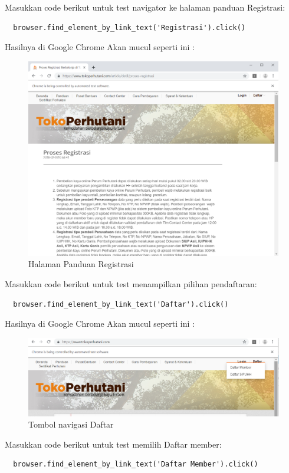 Masukkan code berikut untuk test navigator ke halaman panduan Registrasi:
\begin{verbatim}
  browser.find_element_by_link_text('Registrasi').click()
\end{verbatim}

Hasilnya  di Google Chrome Akan mucul seperti ini :
\begin{figure}[h]
\centering
\includegraphics[scale=0.3]{figures/1pdregis}
\caption{Halaman Panduan Registrasi}
\end{figure}

Masukkan code berikut untuk test menampilkan pilihan pendaftaran:
\begin{verbatim}
  browser.find_element_by_link_text('Daftar').click()
\end{verbatim}

Hasilnya  di Google Chrome Akan mucul seperti ini :
\begin{figure}[h]
\centering
\includegraphics[scale=0.3]{figures/2daftar}
\caption{Tombol navigasi Daftar}
\end{figure}

Masukkan code berikut untuk test memilih Daftar member:
\begin{verbatim}
  browser.find_element_by_link_text('Daftar Member').click()
\end{verbatim}

